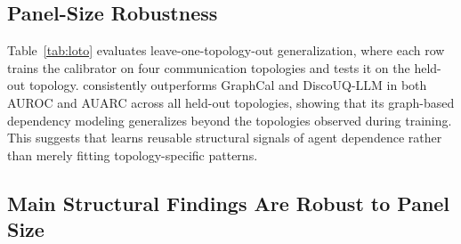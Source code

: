 
\subsection{Panel-Size Robustness}
\label{con:generalization_to_com_top}

Table~\ref{tab:loto} evaluates leave-one-topology-out generalization, where each row trains the calibrator on four communication topologies and tests it on the held-out topology. 
\methodname{} consistently outperforms GraphCal and DiscoUQ-LLM in both AUROC and AUARC across all held-out topologies, showing that its graph-based dependency modeling generalizes beyond the topologies observed during training. 
This suggests that \methodname{} learns reusable structural signals of agent dependence rather than merely fitting topology-specific patterns.

\subsection{Main Structural Findings Are Robust to Panel Size}
\label{con:pannel_size}


